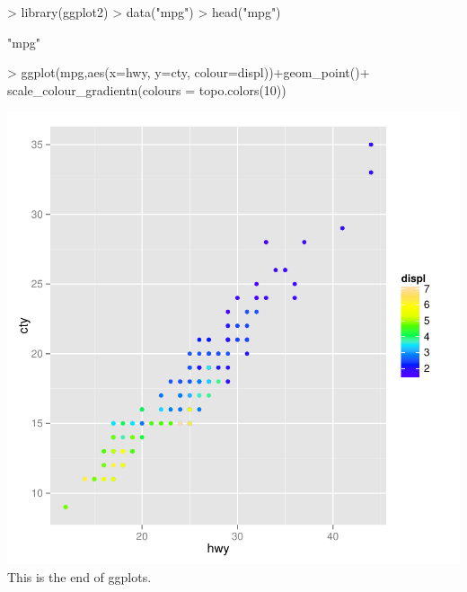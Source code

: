 \documentclass{article}
\begin{document}
\begin{Schunk}
\begin{Sinput}
> library(ggplot2)
> data("mpg")
> head("mpg")
\end{Sinput}
\begin{Soutput}
[1] "mpg"
\end{Soutput}
\begin{Sinput}
> ggplot(mpg,aes(x=hwy, y=cty, colour=displ))+geom_point()+ scale_colour_gradientn(colours = topo.colors(10))
\end{Sinput}
\end{Schunk}
\includegraphics{tutorialJY-Cars3}
This is the end of ggplots.
\end{document}
